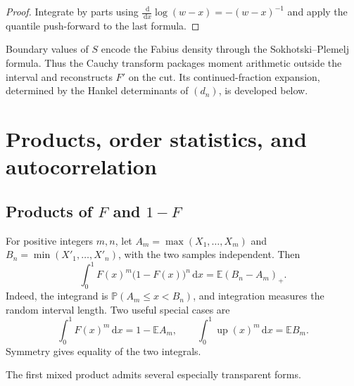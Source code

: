 \documentclass[11pt,oneside]{article}
\theoremstyle{definition}
\theoremstyle{remark}
\newcommand{\E}{\mathbb E}
\newcommand{\Prob}{\mathbb P}
\newcommand{\dd}{\,\mathrm d}
\newcommand{\upf}{\operatorname{up}}
\begin{document}
\begin{proof}
Integrate by parts using $\frac{\dd}{\dd x}\log(w-x)=-(w-x)^{-1}$ and apply the quantile push-forward to the last formula.
\end{proof}

Boundary values of $S$ encode the Fabius density through the Sokhotski--Plemelj formula.  Thus the Cauchy transform packages moment arithmetic outside the interval and reconstructs $F'$ on the cut.  Its continued-fraction expansion, determined by the Hankel determinants of $(d_n)$, is developed below.

\section{Products, order statistics, and autocorrelation}\label{sec:products-correlations}

\subsection{Products of $F$ and $1-F$}

For positive integers $m,n$, let $A_m=\max(X_1,\ldots,X_m)$ and $B_n=\min(X'_1,\ldots,X'_n)$, with the two samples independent.  Then
\begin{equation}\label{eq:order-statistic-product}
 \int_0^1F(x)^m\bigl(1-F(x)\bigr)^n\dd x
 =\E(B_n-A_m)_+.
\end{equation}
Indeed, the integrand is $\Prob(A_m\le x<B_n)$, and integration measures the random interval length.  Two useful special cases are
\begin{equation}\label{eq:powers-order-statistics}
 \int_0^1F(x)^m\dd x=1-\E A_m,
 \qquad
 \int_0^1\upf(x)^m\dd x=\E B_m.
\end{equation}
Symmetry gives equality of the two integrals.

The first mixed product admits several especially transparent forms.
\end{document}
